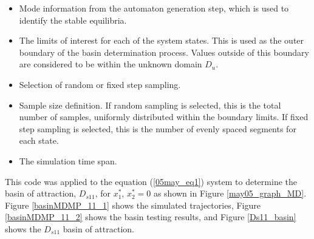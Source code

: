 \documentclass[12pt]{article}
\begin{document}
\begin{itemize}
\item Mode information from the automaton generation step, which is used to identify the stable equilibria.
\item The limits of interest for each of the system states. This is used as the outer boundary of the basin determination process. Values outside of this boundary are considered to be within the unknown domain $D_u$.
\item Selection of random or fixed step sampling.
\item Sample size definition. If random sampling is selected, this is the total number of samples, uniformly distributed within the boundary limits. If fixed step sampling is selected, this is the number of evenly spaced segments for each state.
\item The simulation time span.
\end{itemize}

This code was applied to the equation (\ref{05may_eq1}) system to determine the basin of attraction, $D_{s11}$, for $x_1^*$, $x_2^*=0$ as shown in Figure \ref{may05_graph_MD}. Figure \ref{basinMDMP_11_1} shows the simulated trajectories, Figure \ref{basinMDMP_11_2} shows the basin testing results, and Figure \ref{Ds11_basin} shows the $D_{s11}$ basin of attraction.
\end{document}
